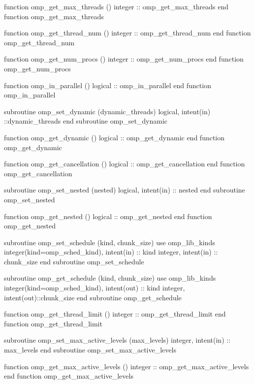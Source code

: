 {\begin{codepar}
          function omp\_get\_max\_threads ()
           integer :: omp\_get\_max\_threads
          end function omp\_get\_max\_threads

          function omp\_get\_thread\_num ()
           integer :: omp\_get\_thread\_num
          end function omp\_get\_thread\_num

          function omp\_get\_num\_procs ()
           integer :: omp\_get\_num\_procs
          end function omp\_get\_num\_procs

          function omp\_in\_parallel ()
           logical :: omp\_in\_parallel
          end function omp\_in\_parallel

          subroutine omp\_set\_dynamic (dynamic\_threads)
           logical, intent(in) ::dynamic\_threads
          end subroutine omp\_set\_dynamic

          function omp\_get\_dynamic ()
           logical :: omp\_get\_dynamic
          end function omp\_get\_dynamic

          function omp\_get\_cancellation ()
           logical :: omp\_get\_cancellation
          end function omp\_get\_cancellation

          subroutine omp\_set\_nested (nested)
           logical, intent(in) :: nested
          end subroutine omp\_set\_nested

          function omp\_get\_nested ()
           logical :: omp\_get\_nested
          end function omp\_get\_nested

          subroutine omp\_set\_schedule (kind, chunk\_size)
           use omp\_lib\_kinds
           integer(kind=omp\_sched\_kind), intent(in) :: kind
           integer, intent(in) :: chunk\_size
          end subroutine omp\_set\_schedule

          subroutine omp\_get\_schedule (kind, chunk\_size)
           use omp\_lib\_kinds
           integer(kind=omp\_sched\_kind), intent(out) :: kind
           integer, intent(out)::chunk\_size
          end subroutine omp\_get\_schedule

          function omp\_get\_thread\_limit ()
           integer :: omp\_get\_thread\_limit
          end function omp\_get\_thread\_limit

          subroutine omp\_set\_max\_active\_levels (max\_levels)
           integer, intent(in) :: max\_levels
          end subroutine omp\_set\_max\_active\_levels

          function omp\_get\_max\_active\_levels ()
           integer :: omp\_get\_max\_active\_levels
          end function omp\_get\_max\_active\_levels


\end{codepar}}
